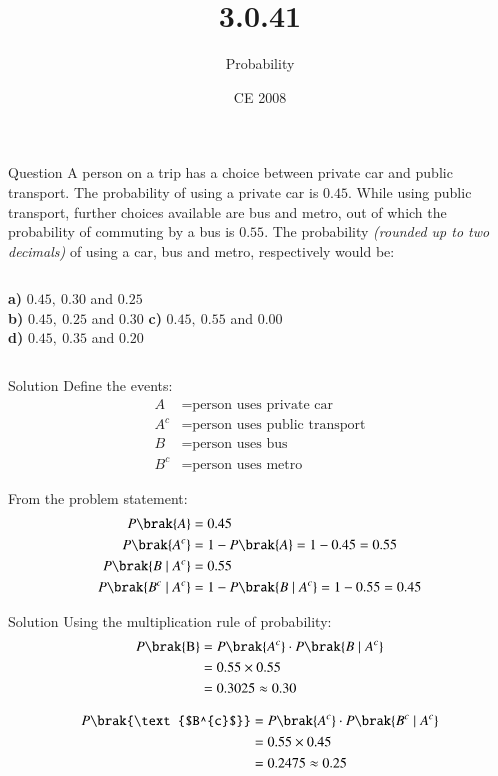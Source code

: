 \documentclass{beamer}
\begin{document}
\title{3.0.41}
\date{CE 2008}
\author{Probability}

\frame{\titlepage}

\begin{frame}{Question}
A person on a trip has a choice between private car and public transport. The
probability of using a private car is $0.45$. While using public transport, further
choices available are bus and metro, out of which the probability of commuting by
a bus is $0.55$. The probability \textit{(rounded up to two decimals)} of using a car,
bus and metro, respectively would be:

\vspace{0.4cm}
\begin{columns}
    \textbf{a)} $0.45,\ 0.30$ and $0.25$\\[0.4cm]
    \textbf{b)} $0.45,\ 0.25$ and $0.30$
    \textbf{c)} $0.45,\ 0.55$ and $0.00$\\[0.4cm]
    \textbf{d)} $0.45,\ 0.35$ and $0.20$
\end{columns}
\end{frame}

\begin{frame}{Solution}
Define the events:
\begin{align}
    A &= \text{person uses private car} \\
    A^{c}&= \text{person uses public transport} \\
    B &= \text{person uses bus} \\
    B^{c} &= \text{person uses metro}
\end{align}

From the problem statement:
\begin{align}
    P\brak{A} &= 0.45 \\
    P\brak{A^{c}} &= 1 - P\brak{A} = 1 - 0.45 = 0.55 \\
    P\brak{B \mid A^{c}} &= 0.55 \\
    P\brak{B^{c} \mid A^{c}} &= 1 - P\brak{B \mid A^{c}} = 1 - 0.55 = 0.45
\end{align}
\end{frame}

\begin{frame}{Solution}
Using the multiplication rule of probability:
\begin{align}
    P\brak{\text{B}} &= P\brak{A^{c}} \cdot P\brak{B \mid A^{c}} \\
                       &= 0.55 \times 0.55 \\
                       &= 0.3025 \approx 0.30
\end{align}

\begin{align}
    P\brak{\text{$B^{c}$}} &= P\brak{A^{c}} \cdot P\brak{B^{c} \mid A^{c}} \\
                         &= 0.55 \times 0.45 \\
                         &= 0.2475 \approx 0.25
\end{align}
\end{frame}
\end{document}
